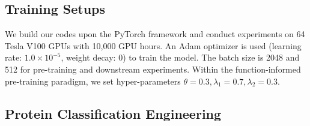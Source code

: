 \subsection{Training Setups}
We build our codes upon the PyTorch framework and conduct experiments on 64 Tesla V100 GPUs with 10,000 GPU hours.
An Adam optimizer is used (learning rate: $1.0 \times 10^{-5}$, weight decay: $0$) to train the model. The batch size is 2048 and 512 for pre-training and downstream experiments. 
Within the function-informed pre-training paradigm, we set hyper-parameters $\theta=0.3, \lambda_1=0.7, \lambda_2=0.3$.

\subsection{Protein Classification Engineering}
\label{Sec:exp1}
